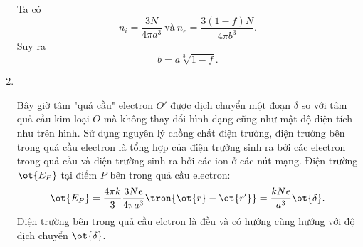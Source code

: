 \begin{loigiai}
\begin{enumerate}[1)]
\begin{minipage}{0.5\textwidth}

            \end{minipage}
            Ta có 
            $$n_i=\dfrac{3N}{4\pi a^3} \ \text{và} \  n_e=\dfrac{3(1-f)N}{4 \pi b^3}.$$
            Suy ra 
            $$b=a\sqrt[3]{1-f}.$$
            \item \hfill \\
            \begin{minipage}{0.5\textwidth}
                 Bây giờ tâm "quả cầu" electron $O'$ được dịch chuyển một đoạn $\delta$ so với tâm quả cầu kim loại $O$ mà không thay đổi hình dạng cũng như mật độ điện tích như trên hình. Sử dụng nguyên lý chồng chất điện trường, điện trường bên trong quả cầu electron là tổng hợp của điện trường sinh ra bởi các electron trong quả cầu và điện trường sinh ra bởi các ion ở các nút mạng. Điện trường $\ot{E_P}$ tại điểm $P$ bên trong quả cầu electron:
            $$\ot{E_P}=\dfrac{4\pi k}{3}\dfrac{3Ne}{4\pi a^3}\tron{\ot{r}-\ot{r'}}=\frac{kNe}{a^3}\ot{\delta}.$$
            Điện trường bên trong quả cầu elctron là đều và có hướng cùng hướng với độ dịch chuyển $\ot{\delta}$.
            \end{minipage}
            \begin{minipage}{0.5\textwidth}
                \centering
                


\begin{tikzpicture}[x=0.75pt,y=0.75pt,yscale=-1,xscale=1]


\end{tikzpicture}
\end{minipage}
\end{enumerate}
\end{loigiai}
